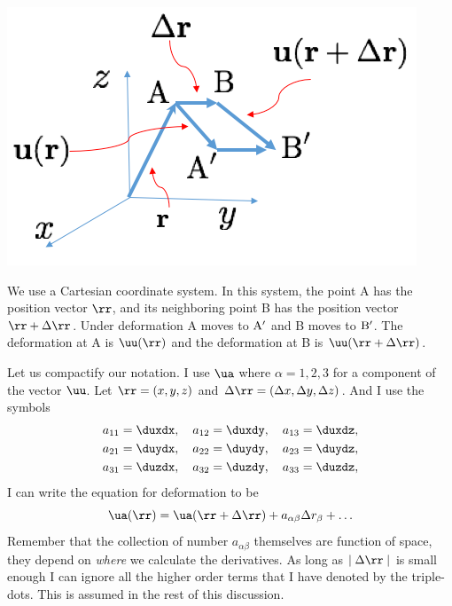 \documentclass{tufte-book} %
\begin{document}
%
 \begin{marginfigure}
  \includegraphics{figures/deform_sketch.png}
 \caption{We use a Cartesian coordinate system. In this system, the
   point A has the position vector $\rr$, and its neighboring point B
 has the position vector $\rr+\Delta \rr$. Under deformation A moves
 to ${\rm A}^{\prime}$ and B moves to ${\rm B}^{\prime}$. The
 deformation at A is $\uu(\rr)$ and the deformation at B is
 $\uu(\rr+\Delta \rr)$. }
  \label{fig:dsketch}
\end{marginfigure}
%
Let us compactify our notation. I use $\ua$ where $\alpha =1,2,3$ for
a component of the vector $\uu$. Let $\rr = (x,y,z)$ and $\Delta\rr =
(\Delta x, \Delta y, \Delta z)$. And I use the symbols 
\begin{subequations}
\begin{align}
a_{11} & =  \duxdx  \/, \quad a_{12} =  \duxdy \/,\quad  a_{13} =
         \duxdz \/, \\
a_{21} & =  \duydx  \/, \quad a_{22} =  \duydy \/,\quad  a_{23} =
         \duydz \/, \\
 a_{31} & =  \duzdx  \/, \quad a_{32} =  \duzdy \/,\quad  a_{33} =
         \duzdz \/,
\end{align} 
\end{subequations}
I can write the equation for deformation to be 
\begin{equation}
\ua(\rr) = \ua(\rr+\Delta \rr) + a_{\alpha\beta} \Delta r_{\beta} + \ldots
\end{equation}
Remember that the collection of number $a_{\alpha\beta}$ themselves
are function of space, they depend on \textit{where} we calculate the
derivatives.  As long as  $\mid\Delta \rr\mid$ is small enough I can
ignore all the higher order terms that I have denoted by the
triple-dots.  This is assumed in the rest of this discussion. 
\end{document}
